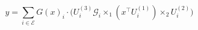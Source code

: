 \documentclass[preview,border=10pt]{standalone}
\begin{document}
$$ y = \sum_{i \in \mathcal{E}} G(x)_i \cdot \Big( U^{(3)}_i \mathcal{G}_i \times_1 (x^\top U^{(1)}_i) \times_2 U^{(2)}_i \Big) $$
\end{document}
